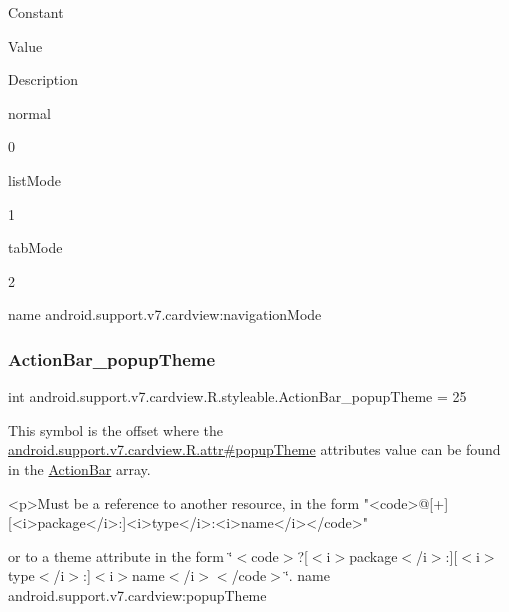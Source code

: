 Constant

Value

Description 

{\ttfamily normal}

0

{\ttfamily list\+Mode}

1

{\ttfamily tab\+Mode}

2

name android.\+support.\+v7.\+cardview\+:navigation\+Mode \mbox{\label{classandroid_1_1support_1_1v7_1_1cardview_1_1R_1_1styleable_ae6bbb52b8e6d4f856f7ffd1afa9696da}} 
\subsubsection{\texorpdfstring{Action\+Bar\+\_\+popup\+Theme}{ActionBar\_popupTheme}}
{\footnotesize\ttfamily int android.\+support.\+v7.\+cardview.\+R.\+styleable.\+Action\+Bar\+\_\+popup\+Theme = 25\hspace{0.3cm}{\ttfamily [static]}}

This symbol is the offset where the \hyperlink{classandroid_1_1support_1_1v7_1_1cardview_1_1R_1_1attr_a6361a1d29dba71235a7925dc34e36e20}{android.\+support.\+v7.\+cardview.\+R.\+attr\#popup\+Theme} attribute\textquotesingle{}s value can be found in the \hyperlink{classandroid_1_1support_1_1v7_1_1cardview_1_1R_1_1styleable_a0cbf7f776e31f78bb0a2b558daf176f8}{Action\+Bar} array.

\begin{DoxyVerb}      <p>Must be a reference to another resource, in the form "<code>@[+][<i>package</i>:]<i>type</i>:<i>name</i></code>"
\end{DoxyVerb}
 or to a theme attribute in the form \char`\"{}$<$code$>$?\mbox{[}$<$i$>$package$<$/i$>$\+:\mbox{]}\mbox{[}$<$i$>$type$<$/i$>$\+:\mbox{]}$<$i$>$name$<$/i$>$$<$/code$>$\char`\"{}.  name android.\+support.\+v7.\+cardview\+:popup\+Theme \mbox{\label{classandroid_1_1support_1_1v7_1_1cardview_1_1R_1_1styleable_a3ae19c2401365683869b64e9daa1c028}} 

